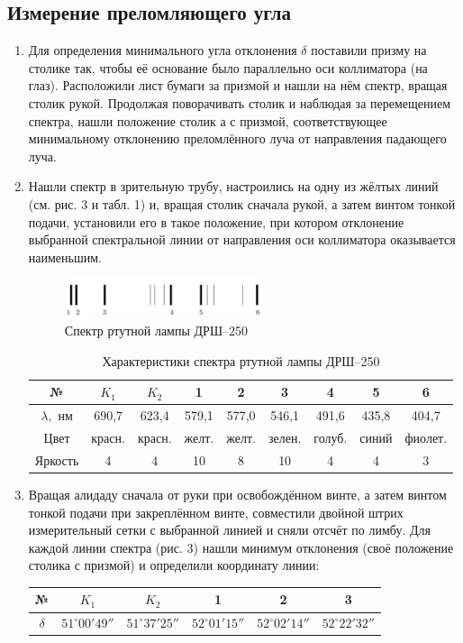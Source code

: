 \documentclass[a4paper,12pt]{article}
\begin{document}
	\subsection*{Измерение преломляющего угла}
	\begin{enumerate}
		\item Для определения минимального угла отклонения $\delta$ поставили призму на столике так, чтобы её основание было параллельно оси коллиматора (на глаз). Расположили лист бумаги за призмой и нашли на нём спектр, вращая столик рукой. Продолжая поворачивать столик и наблюдая за перемещением спектра, нашли положение столик а с призмой, соответствующее минимальному отклонению преломлённого луча от направления падающего луча.
		
		\item Нашли спектр в зрительную трубу, настроились на одну из жёлтых линий (см. рис. 3 и табл. 1) и, вращая столик сначала рукой, а затем винтом тонкой подачи, установили его в такое положение, при котором отклонение выбранной спектральной линии от направления оси коллиматора оказывается наименьшим.		
		\begin{figure}[h]
			\begin{center}
				\includegraphics[width = 0.55\textwidth]{443-3.png}
				\caption{Спектр ртутной лампы ДРШ--250}
			\end{center}
		\end{figure}
	\begin{table}[]
		\centering
		\begin{tabular}{|c|c|c|c|c|c|c|c|c|}
			\hline
			№ & $K_1$ & $K_2$ & 1 & 2 & 3 & 4 & 5 & 6 \\ \hline
			$\lambda,$ нм & 690,7 & 623,4 & 579,1 & 577,0 & 546,1 & 491,6 & 435,8 & 404,7 \\ \hline
			Цвет &красн.&красн.& желт. & желт. & зелен. & голуб. & синий & фиолет. \\ \hline
			Яркость & 4 & 4&10 & 8 & 10 & 4 & 4 & 3 \\ \hline
		\end{tabular}
		\caption{Характеристики спектра ртутной лампы ДРШ--250}
		\label{tab:my-table}
	\end{table}
	\item Вращая алидаду сначала от руки при освобождённом винте, а затем винтом тонкой подачи при закреплённом винте, совместили двойной штрих измерительный сетки с выбранной линией и сняли отсчёт по лимбу. Для каждой линии спектра (рис. 3) нашли минимум отклонения (своё положение столика с призмой) и определили координату линии:
	\begin{center}
		\centering
		\begin{tabular}{|c|c|c|c|c|c|}
			\hline
			№ & $K_1$ & $K_2$ & 1 & 2 & 3  \\ \hline
			$\delta$ & $51^\circ00'49''$ & $51^\circ37'25''$ & $52^\circ01'15''$ & $52^\circ02'14''$ & $52^\circ22'32''$ \\ \hline
		\end{tabular}
	

\end{center}
\end{enumerate}
\end{document}
